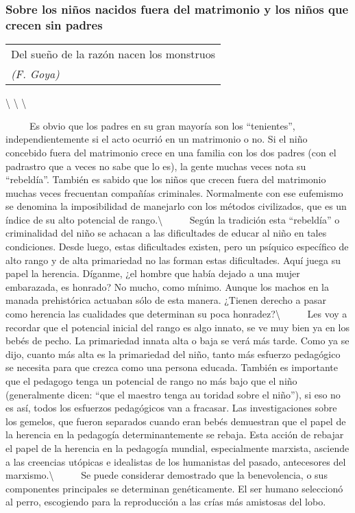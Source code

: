 \protect\hypertarget{M13}{}{}

\subsubsection{Sobre los niños nacidos fuera del matrimonio y los niños
que crecen sin
padres}\label{sobre-los-niuxf1os-nacidos-fuera-del-matrimonio-y-los-niuxf1os-que-crecen-sin-padres}

\begin{longtable}[]{@{}l@{}}
\toprule
Del sueño de la razón nacen los monstruos\tabularnewline
\emph{(F. Goya)}\tabularnewline
\bottomrule
\end{longtable}

\textbackslash{} \textbackslash{} \textbackslash{}

~ ~ ~ Es obvio que los padres en su gran mayoría son los ``tenientes'',
independientemente si el acto ocurrió en un matrimonio o no. Si el niño
concebido fuera del matrimonio crece en una familia con los dos padres
(con el padrastro que a veces no sabe que lo es), la gente muchas veces
nota su ``rebeldía''. También es sabido que los niños que crecen fuera
del matrimonio muchas veces frecuentan compañías criminales. Normalmente
con ese eufemismo se denomina la imposibilidad de manejarlo con los
métodos civilizados, que es un índice de su alto potencial de
rango.\textbackslash{} ~ ~ ~ Según la tradición esta ``rebeldía'' o
criminalidad del niño se achacan a las dificultades de educar al niño en
tales condiciones. Desde luego, estas dificultades existen, pero un
psíquico específico de alto rango y de alta primariedad no las forman
estas dificultades. Aquí juega su papel la herencia. Díganme, ¿el hombre
que había dejado a una mujer embarazada, es honrado? No mucho, como
mínimo. Aunque los machos en la manada prehistórica actuaban sólo de
esta manera. ¿Tienen derecho a pasar como herencia las cualidades que
determinan su poca honradez?\textbackslash{} ~ ~ ~ Les voy a recordar
que el potencial inicial del rango es algo innato, se ve muy bien ya en
los bebés de pecho. La primariedad innata alta o baja se verá más tarde.
Como ya se dijo, cuanto más alta es la primariedad del niño, tanto más
esfuerzo pedagógico se necesita para que crezca como una persona
educada. También es importante que el pedagogo tenga un potencial de
rango no más bajo que el niño (generalmente dicen: ``que el maestro
tenga au toridad sobre el niño''), si eso no es así, todos los esfuerzos
pedagógicos van a fracasar. Las investigaciones sobre los gemelos, que
fueron separados cuando eran bebés demuestran que el papel de la
herencia en la pedagogía determinantemente se rebaja. Esta acción de
rebajar el papel de la herencia en la pedagogía mundial, especialmente
marxista, asciende a las creencias utópicas e idealistas de los
humanistas del pasado, antecesores del marxismo.\textbackslash{} ~ ~ ~
Se puede considerar demostrado que la benevolencia, o sus componentes
principales se determinan genéticamente. El ser humano seleccionó al
perro, escogiendo para la reproducción a las crías más amistosas del
lobo.

